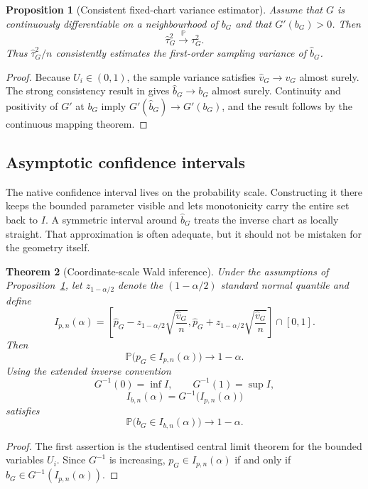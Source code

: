 \documentclass[11pt,a4paper]{article}
\newtheorem{theorem}{Theorem}[section]
\newtheorem{proposition}[theorem]{Proposition}
\theoremstyle{definition}
\newcommand{\Prob}{\mathbb{P}}
\begin{document}
\begin{proposition}[Consistent fixed-chart variance estimator]\label{prop:fixed-var}
Assume that $G$ is continuously differentiable on a neighbourhood of $b_G$ and that $G'(b_G)>0$. Then
\[
\widehat\tau_G^2\xrightarrow{\Prob}\tau_G^2.
\]
Thus $\widehat\tau_G^2/n$ consistently estimates the first-order sampling variance of $\widehat b_G$.
\end{proposition}

\begin{proof}
Because $U_i\in(0,1)$, the sample variance satisfies $\widehat v_G\to v_G$ almost surely. The strong consistency result in \cite{Cojocea2026} gives $\widehat b_G\to b_G$ almost surely. Continuity and positivity of $G'$ at $b_G$ imply $G'(\widehat b_G)\to G'(b_G)$, and the result follows by the continuous mapping theorem.
\end{proof}

\subsection{Asymptotic confidence intervals}

The native confidence interval lives on the probability scale. Constructing it there keeps the bounded parameter visible and lets monotonicity carry the entire set back to $I$. A symmetric interval around $\widehat b_G$ treats the inverse chart as locally straight. That approximation is often adequate, but it should not be mistaken for the geometry itself.

\begin{theorem}[Coordinate-scale Wald inference]\label{thm:fixed-wald}
Under the assumptions of Proposition~\ref{prop:fixed-var}, let $z_{1-\alpha/2}$ denote the $(1-\alpha/2)$ standard normal quantile and define
\[
I_{p,n}(\alpha)
=
\left[
\widehat p_G-z_{1-\alpha/2}\sqrt{\frac{\widehat v_G}{n}},
\widehat p_G+z_{1-\alpha/2}\sqrt{\frac{\widehat v_G}{n}}
\right]\cap[0,1].
\]
Then
\[
\Prob\bigl(p_G\in I_{p,n}(\alpha)\bigr)\longrightarrow1-\alpha.
\]
Using the extended inverse convention
\[
G^{-1}(0)=\inf I,
\qquad
G^{-1}(1)=\sup I,
\]
\[
I_{b,n}(\alpha)=G^{-1}\!\bigl(I_{p,n}(\alpha)\bigr)
\]
satisfies
\[
\Prob\bigl(b_G\in I_{b,n}(\alpha)\bigr)\longrightarrow1-\alpha.
\]
\end{theorem}

\begin{proof}
The first assertion is the studentised central limit theorem for the bounded variables $U_i$. Since $G^{-1}$ is increasing, $p_G\in I_{p,n}(\alpha)$ if and only if $b_G\in G^{-1}(I_{p,n}(\alpha))$.
\end{proof}
\end{document}
